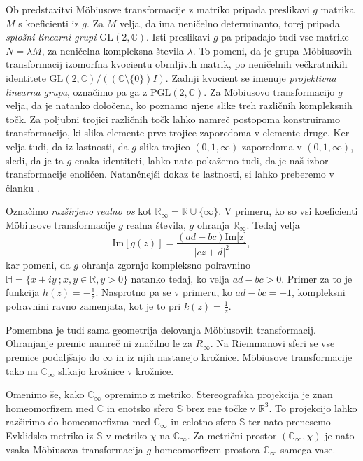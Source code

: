 \documentclass[a4paper,12pt]{article}
\def\R{\mathbb{R}} %
\def\C{\mathbb{C}} %
\def\Ci{\mathbb{C}_{\infty}} %
\def\H{\mathbb{H}} %
\begin{document}
Ob predstavitvi M\"obiusove transformacije z matriko pripada preslikavi $g$ matrika $M$ s koeficienti iz $g$. Za $M$ velja, da ima neničelno determinanto, torej pripada \emph{splošni linearni grupi} $\text{GL}(2, \C)$. Isti preslikavi $g$ pa pripadajo tudi vse matrike $N = \lambda M$, za neničelna kompleksna števila $\lambda$. To pomeni, da je grupa M\"obiusovih transformacij izomorfna kvocientu obrnljivih matrik, po neničelnih večkratnikih identitete $\text{GL}(2, \C) / ((\C \setminus \{0\})I)$. Zadnji kvocient se imenuje \emph{projektivna linearna grupa}, označimo pa ga z $\text{PGL}(2, \C)$. Za M\"obiusovo transformacijo $g$ velja, da je natanko določena, ko poznamo njene slike treh različnih kompleksnih točk. Za poljubni trojici različnih točk lahko namreč postopoma konstruiramo transformacijo, ki slika elemente prve trojice zaporedoma v elemente druge. Ker velja tudi, da iz lastnosti, da $g$ slika trojico $(0, 1, \infty)$ zaporedoma v $(0, 1, \infty)$, sledi, da je ta $g$ enaka identiteti, lahko nato pokažemo tudi, da je naš izbor transformacije enoličen. Natančnejši dokaz te lastnosti, si lahko preberemo v članku \cite{Schwartz}.

Označimo \emph{razširjeno realno os} kot $\R_{\infty} = \R \cup \{\infty\}$. V primeru, ko so vsi koeficienti M\"obiusove transformacije $g$ realna števila, $g$ ohranja $\R_{\infty}$. Tedaj velja
\[
    \text{Im}[g(z)] = \frac{(ad - bc)\text{Im[z]}}{|cz + d|^2},
\]
kar pomeni, da $g$ ohranja zgornjo kompleksno polravnino $\H = \{x + iy\ ; x, y \in \R, y > 0\}$ natanko tedaj, ko velja $ad - bc > 0$. Primer za to je funkcija $h(z) = - \frac{1}{z}$. Nasprotno pa se v primeru, ko $ad - bc = -1$, kompleksni polravnini ravno zamenjata, kot je to pri $k(z) = \frac{1}{z}$.

Pomembna je tudi sama geometrija delovanja M\"obiusovih transformacij. Ohranjanje premic namreč ni značilno le za $R_\infty$. Na Riemmanovi sferi se vse premice podaljšajo do $\infty$ in iz njih nastanejo krožnice. M\"obiusove transformacije tako na $\Ci$ slikajo krožnice v krožnice.

Omenimo še, kako $\Ci$ opremimo z metriko. Stereografska projekcija je znan homeomorfizem med $\C$ in enotsko sfero $\mathbb{S}$ brez ene točke v $\R^3$. To projekcijo lahko razširimo do homeomorfizma med $\Ci$ in celotno sfero $\mathbb{S}$ ter nato prenesemo Evklidsko metriko iz $\mathbb{S}$ v metriko $\chi$ na $\Ci$. Za metrični prostor $(\Ci, \chi)$ je nato vsaka M\"obiusova transformacija $g$ homeomorfizem prostora $\Ci$ samega vase.
\end{document}
